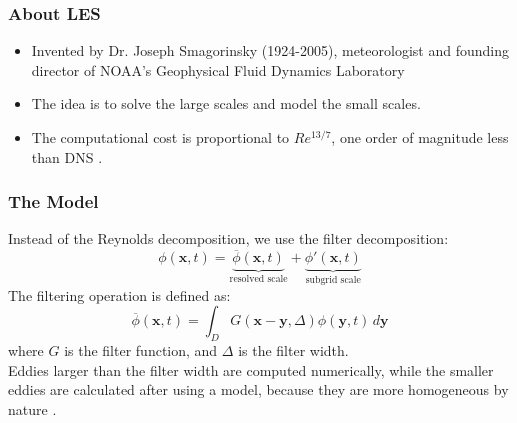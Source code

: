 \documentclass{beamer}
\begin{document}
\begin{frame}
  \frametitle{About LES}
  \begin{itemize}
    \item Invented by Dr. Joseph Smagorinsky (1924-2005), meteorologist and
     founding director of NOAA’s Geophysical Fluid Dynamics Laboratory 
     \cite{zhiyinLargeeddySimulationPresent2015} 
    \item The idea is to solve the large scales and model the small scales. 
    \item The computational cost is proportional to $Re^{13/7}$,
     one order of magnitude less than DNS \cite{choiGridpointRequirementsLarge2012}.
  \end{itemize}
\end{frame}
\begin{frame}
  \frametitle{The Model}
  Instead of the Reynolds decomposition, we use the filter decomposition:
  \begin{equation}
  \phi(\mathbf{x},t) = \underbrace{\overline{\phi}(\mathbf{x},t)}_{\text{resolved scale}}
   + \underbrace{\phi'(\mathbf{x},t)}_{\text{subgrid scale}}
  \end{equation}
  The filtering operation is defined as:
\begin{equation}
    \overline{\phi}(\mathbf{x}, t) = \int_D G(\mathbf{x} - \mathbf{y}, \Delta) \phi(\mathbf{y}, t) \, d\mathbf{y}
  \end{equation}
  where $G$ is the filter function, and $\Delta$ is the filter width.\\
  Eddies larger than the filter width are computed numerically, while the smaller
  eddies are calculated after using a model, because they are more homogeneous by nature \cite{zouLARGEEDDYSIMULATION2006}.
\end{frame}
\end{document}
